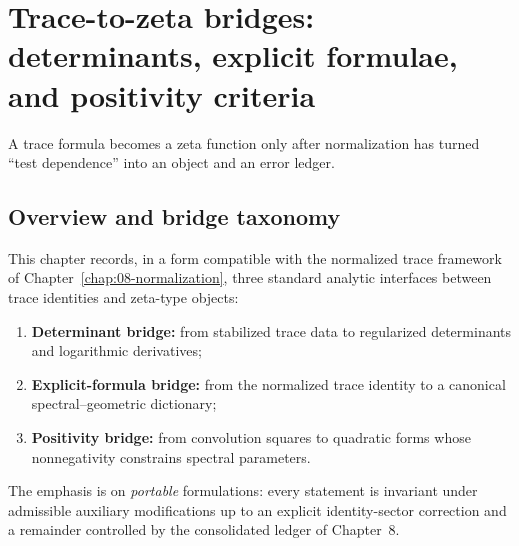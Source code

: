 %

\chapter{Trace-to-zeta bridges: determinants, explicit formulae, and positivity criteria}
\label{chap:10-trace-to-zeta}

\epigraph{A trace formula becomes a zeta function only after normalization has turned ``test dependence'' into an object and an error ledger.}{}

\section{Overview and bridge taxonomy}
\label{sec:10.overview}

This chapter records, in a form compatible with the normalized trace framework of
Chapter~\ref{chap:08-normalization}, three standard analytic interfaces between trace identities and zeta-type objects:

\begin{enumerate}
\item \textbf{Determinant bridge:} from stabilized trace data to regularized determinants and logarithmic derivatives;
\item \textbf{Explicit-formula bridge:} from the normalized trace identity to a canonical spectral--geometric dictionary;
\item \textbf{Positivity bridge:} from convolution squares to quadratic forms whose nonnegativity constrains spectral parameters.
\end{enumerate}

The emphasis is on \emph{portable} formulations: every statement is invariant under admissible auxiliary modifications
up to an explicit identity-sector correction and a remainder controlled by the consolidated ledger of Chapter~8.

